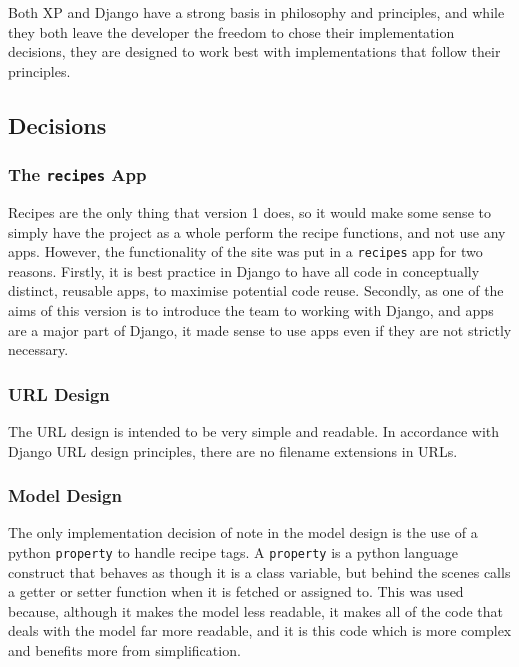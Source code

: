 Both XP and Django have a strong basis in philosophy and principles, and while they both leave the developer the freedom to chose their implementation decisions, they are designed to work best with implementations that follow their principles.

\subsection{Decisions}

\subsubsection{The \texttt{recipes} App}

Recipes are the only thing that version 1 does, so it would make some sense to simply have the project as a whole perform the recipe functions, and not use any apps. However, the functionality of the site was put in a \texttt{recipes} app for two reasons.
Firstly, it is best practice in Django to have all code in conceptually distinct, reusable apps, to maximise potential code reuse.
Secondly, as one of the aims of this version is to introduce the team to working with Django, and apps are a major part of Django, it made sense to use apps even if they are not strictly necessary.


\subsubsection{URL Design}

The URL design is intended to be very simple and readable. In accordance with Django URL design principles, there are no filename extensions in URLs.


\subsubsection{Model Design}

The only implementation decision of note in the model design is the use of a python \texttt{property} to handle recipe tags. A \texttt{property} is a python language construct that behaves as though it is a class variable, but behind the scenes calls a getter or setter function when it is fetched or assigned to. This was used because, although it makes the model less readable, it makes all of the code that deals with the model far more readable, and it is this code which is more complex and benefits more from simplification.

